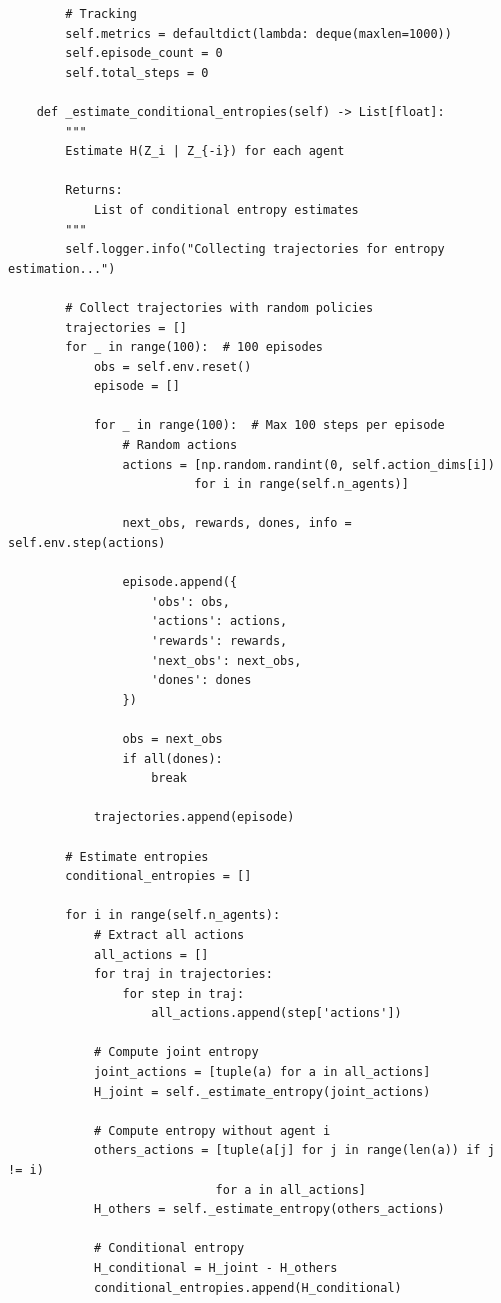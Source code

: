 \documentclass[10pt, letterpaper]{article}
\begin{document}
\begin{lstlisting}
        # Tracking
        self.metrics = defaultdict(lambda: deque(maxlen=1000))
        self.episode_count = 0
        self.total_steps = 0

    def _estimate_conditional_entropies(self) -> List[float]:
        """
        Estimate H(Z_i | Z_{-i}) for each agent

        Returns:
            List of conditional entropy estimates
        """
        self.logger.info("Collecting trajectories for entropy estimation...")

        # Collect trajectories with random policies
        trajectories = []
        for _ in range(100):  # 100 episodes
            obs = self.env.reset()
            episode = []

            for _ in range(100):  # Max 100 steps per episode
                # Random actions
                actions = [np.random.randint(0, self.action_dims[i])
                          for i in range(self.n_agents)]

                next_obs, rewards, dones, info = self.env.step(actions)

                episode.append({
                    'obs': obs,
                    'actions': actions,
                    'rewards': rewards,
                    'next_obs': next_obs,
                    'dones': dones
                })

                obs = next_obs
                if all(dones):
                    break

            trajectories.append(episode)

        # Estimate entropies
        conditional_entropies = []

        for i in range(self.n_agents):
            # Extract all actions
            all_actions = []
            for traj in trajectories:
                for step in traj:
                    all_actions.append(step['actions'])

            # Compute joint entropy
            joint_actions = [tuple(a) for a in all_actions]
            H_joint = self._estimate_entropy(joint_actions)

            # Compute entropy without agent i
            others_actions = [tuple(a[j] for j in range(len(a)) if j != i)
                             for a in all_actions]
            H_others = self._estimate_entropy(others_actions)

            # Conditional entropy
            H_conditional = H_joint - H_others
            conditional_entropies.append(H_conditional)


\end{lstlisting}
\end{document}
